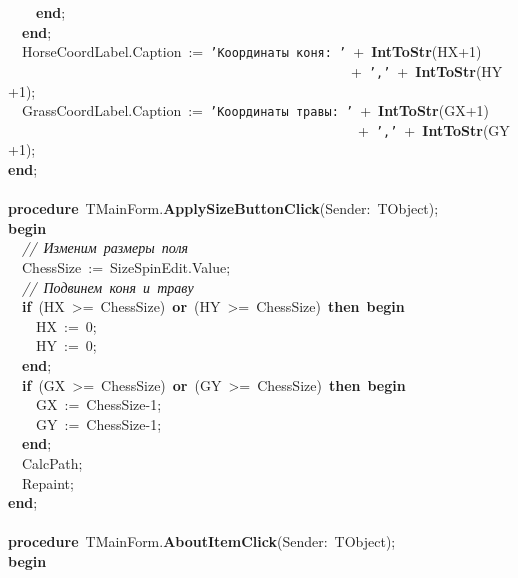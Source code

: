 \mbox{}\ \ \ \ \textbf{end}; \\
\mbox{}\ \ \textbf{end}; \\
\mbox{}\ \ HorseCoordLabel.Caption\ :=\ \texttt{'Координаты\ коня:\ '}\ +\ \textbf{IntToStr}(HX+1) \\
\mbox{}\ \ \ \ \ \ \ \ \ \ \ \ \ \ \ \ \ \ \ \ \ \ \ \ \ \ \ \ \ \ \ \ \ \ \ \ \ \ \ \ \ \ \ \ \ \ \ \ \ +\ \texttt{','}\ +\ \textbf{IntToStr}(HY+1); \\
\mbox{}\ \ GrassCoordLabel.Caption\ :=\ \texttt{'Координаты\ травы:\ '}\ +\ \textbf{IntToStr}(GX+1) \\
\mbox{}\ \ \ \ \ \ \ \ \ \ \ \ \ \ \ \ \ \ \ \ \ \ \ \ \ \ \ \ \ \ \ \ \ \ \ \ \ \ \ \ \ \ \ \ \ \ \ \ \ \ +\ \texttt{','}\ +\ \textbf{IntToStr}(GY+1); \\
\mbox{}\textbf{end}; \\
\mbox{} \\
\mbox{}\textbf{procedure}\ TMainForm.\textbf{ApplySizeButtonClick}(Sender:\ TObject); \\
\mbox{}\textbf{begin} \\
\mbox{}\ \ \textit{//\ Изменим\ размеры\ поля} \\
\mbox{}\ \ ChessSize\ :=\ SizeSpinEdit.Value; \\
\mbox{}\ \ \textit{//\ Подвинем\ коня\ и\ траву} \\
\mbox{}\ \ \textbf{if}\ (HX\ \textgreater{}=\ ChessSize)\ \textbf{or}\ (HY\ \textgreater{}=\ ChessSize)\ \textbf{then}\ \textbf{begin} \\
\mbox{}\ \ \ \ HX\ :=\ 0; \\
\mbox{}\ \ \ \ HY\ :=\ 0; \\
\mbox{}\ \ \textbf{end}; \\
\mbox{}\ \ \textbf{if}\ (GX\ \textgreater{}=\ ChessSize)\ \textbf{or}\ (GY\ \textgreater{}=\ ChessSize)\ \textbf{then}\ \textbf{begin} \\
\mbox{}\ \ \ \ GX\ :=\ ChessSize-1; \\
\mbox{}\ \ \ \ GY\ :=\ ChessSize-1; \\
\mbox{}\ \ \textbf{end}; \\
\mbox{}\ \ CalcPath; \\
\mbox{}\ \ Repaint; \\
\mbox{}\textbf{end}; \\
\mbox{} \\
\mbox{}\textbf{procedure}\ TMainForm.\textbf{AboutItemClick}(Sender:\ TObject); \\
\mbox{}\textbf{begin} \\
